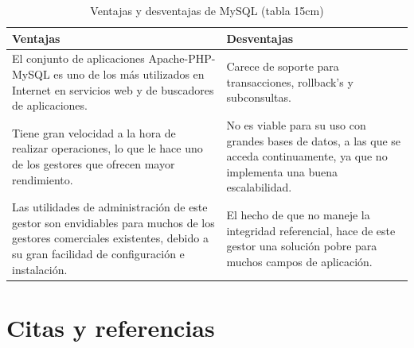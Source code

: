 \documentclass[thesis]{udpbook}
\begin{document}
\begin{table}
\begin{center}
\resizebox{15cm}{!} {

\begin{tabular}{|p{7.5cm}|p{7.5cm}|}

\hline

Ventajas & Desventajas \\

\hline

El conjunto de aplicaciones Apache-PHP-MySQL es uno de los más utilizados en Internet en servicios web y de buscadores de aplicaciones. & Carece de soporte para transacciones, rollback's y subconsultas. \\



\hline

Tiene gran velocidad a la hora de realizar operaciones, lo que le hace uno de los gestores que ofrecen mayor rendimiento. & No es viable para su uso con grandes bases de datos, a las que se acceda continuamente, ya que no implementa una buena escalabilidad. \\


\hline

Las utilidades de administración de este gestor son envidiables para muchos de los gestores comerciales existentes, debido a su gran facilidad de configuración e instalación. &  El hecho de que no maneje la integridad referencial, hace de este gestor una solución pobre para muchos campos de aplicación.\\

\hline

\end{tabular}

}

\end{center}

\caption{Ventajas y desventajas de MySQL (tabla 15cm)}

\label{Ventajas y desventajas de MySQL}

\end{table} 







\section{Citas y referencias} \label{chsubsub:citas y referencias}
\end{document}
